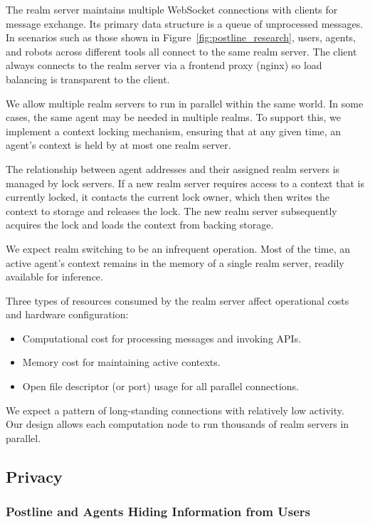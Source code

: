 The realm server maintains multiple WebSocket connections with clients for message exchange. Its primary data structure is a queue of unprocessed messages. In scenarios such as those shown in Figure~\ref{fig:postline_research}, users, agents, and robots across different tools all connect to the same realm server.  The client always connects to the realm server via a frontend proxy (nginx) so load balancing is transparent to the client.

We allow multiple realm servers to run in parallel within the same world. In some cases, the same agent may be needed in multiple realms. To support this, we implement a context locking mechanism, ensuring that at any given time, an agent's context is held by at most one realm server.

The relationship between agent addresses and their assigned realm servers is managed by lock servers. If a new realm server requires access to a context that is currently locked, it contacts the current lock owner, which then writes the context to storage and releases the lock. The new realm server subsequently acquires the lock and loads the context from backing storage.

We expect realm switching to be an infrequent operation. Most of the time, an active agent’s context remains in the memory of a single realm server, readily available for inference.

Three types of resources consumed by the realm server affect operational costs and hardware configuration:
\begin{itemize}
    \item Computational cost for processing messages and invoking APIs.
    \item Memory cost for maintaining active contexts.
    \item Open file descriptor (or port) usage for all parallel connections.
\end{itemize}

We expect a pattern of long-standing connections with relatively low activity. Our design allows each computation node to run thousands of realm servers in parallel.

\subsection{Privacy}

\subsubsection*{Postline and Agents Hiding Information from Users}

